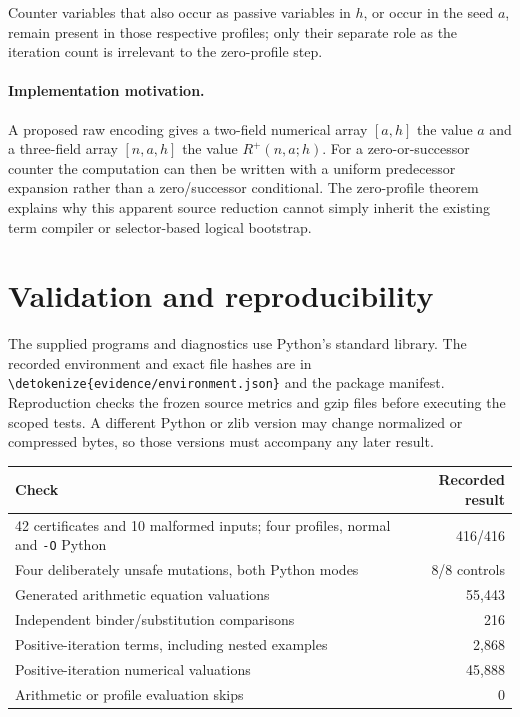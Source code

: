 \documentclass[11pt,letterpaper]{article}
\theoremstyle{definition}\newtheorem{definition}[theorem]{Definition}
\theoremstyle{remark}\newtheorem{remark}[theorem]{Remark}
\newcommand{\file}[1]{\expandafter\nolinkurl\expandafter{\detokenize{#1}}}
\begin{document}
Counter variables that also occur as passive variables in $h$, or occur
in the seed $a$, remain present in those respective profiles; only their
separate role as the iteration count is irrelevant to the zero-profile
step.

\paragraph{Implementation motivation.}
A proposed raw encoding gives a two-field numerical array $[a,h]$
the value $a$ and a three-field array $[n,a,h]$ the value
$R^+(n,a;h)$.  For a zero-or-successor counter the computation can then
be written with a uniform predecessor expansion rather than a
zero/successor conditional.  The zero-profile theorem explains why
this apparent source reduction cannot simply inherit the existing
term compiler or selector-based logical bootstrap.


\section{Validation and reproducibility}

The supplied programs and diagnostics use Python's standard library.
The recorded environment and exact file hashes are in
\file{evidence/environment.json} and the package manifest. Reproduction
checks the frozen source metrics and gzip files before executing the
scoped tests. A different Python or zlib version may change normalized
or compressed bytes, so those versions must accompany any later result.

\begin{center}\small
\begin{tabular}{p{.66\linewidth}r}
\toprule
Check & Recorded result\\
\midrule
42 certificates and 10 malformed inputs; four profiles, normal and
\texttt{-O} Python &416/416\\
Four deliberately unsafe mutations, both Python modes &8/8 controls\\
Generated arithmetic equation valuations &55,443\\
Independent binder/substitution comparisons &216\\
Positive-iteration terms, including nested examples &2,868\\
Positive-iteration numerical valuations &45,888\\
Arithmetic or profile evaluation skips &0\\
\bottomrule
\end{tabular}
\end{center}
\end{document}
